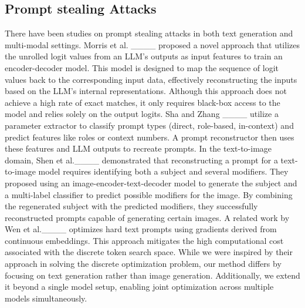 \subsection{Prompt stealing Attacks}
There have been studies on prompt stealing attacks in both text generation and multi-modal settings. Morris et al. ____ proposed a novel approach that utilizes the unrolled logit values from an LLM's outputs as input features to train an encoder-decoder model. This model is designed to map the sequence of logit values back to the corresponding input data, effectively reconstructing the inputs based on the LLM's internal representations. Although this approach does not achieve a high rate of exact matches, it only requires black-box access to the model and relies solely on the output logits. Sha and Zhang ____ utilize a parameter extractor to classify prompt types (direct, role-based, in-context) and predict features like roles or context numbers. A prompt reconstructor then uses these features and LLM outputs to recreate prompts. In the text-to-image domain, Shen et al.____ demonstrated that reconstructing a prompt for a text-to-image model requires identifying both a subject and several modifiers. They proposed using an image-encoder-text-decoder model to generate the subject and a multi-label classifier to predict possible modifiers for the image. By combining the regenerated subject with the predicted modifiers, they successfully reconstructed prompts capable of generating certain images. A related work by Wen et al.____ optimizes hard text prompts using gradients derived from continuous embeddings. This approach mitigates the high computational cost associated with the discrete token search space. While we were inspired by their approach in solving the discrete optimization problem, our method differs by focusing on text generation rather than image generation. Additionally, we extend it beyond a single model setup, enabling joint optimization across multiple models simultaneously.